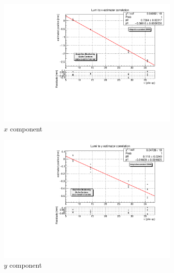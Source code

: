 \begin{figure}
    \centering
    \begin{subfigure}{0.31\textwidth}
    \centering
    \includegraphics[width=\linewidth]{figures/x_to_lumi_fit_20000.pdf}
    \caption{$x$ component}
    \label{fig:x_to_lumi}
    \end{subfigure}\hfill
    \begin{subfigure}{0.31\textwidth}
    \centering
    \includegraphics[width=\linewidth]{figures/y_to_lumi_fit_20000.pdf}
    \caption{$y$ component}
    \label{fig:y_to_lumi}
    \end{subfigure}\hfill
    \begin{subfigure}{0.31\textwidth}
    \centering

\end{subfigure}
\end{figure}
